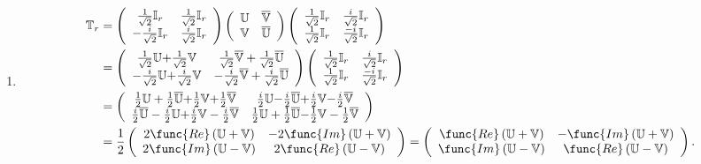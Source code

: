 \documentclass[aps,preprint]{revtex4}
\begin{document}
\begin{enumerate}
\item 
\begin{align}
\mathbb{T}_{r}& =\left( 
\begin{array}{cc}
\frac{1}{\sqrt{2}}\mathbb{I}_{r} & \frac{1}{\sqrt{2}}\mathbb{I}_{r} \\ 
-\frac{i}{\sqrt{2}}\mathbb{I}_{r} & \frac{i}{\sqrt{2}}\mathbb{I}_{r}%
\end{array}%
\right) \left( 
\begin{array}{cc}
\mathbb{U} & \overline{\mathbb{V}} \\ 
\mathbb{V} & \overline{\mathbb{U}}%
\end{array}%
\right) \left( 
\begin{array}{cc}
\frac{1}{\sqrt{2}}\mathbb{I}_{r} & \frac{i}{\sqrt{2}}\mathbb{I}_{r} \\ 
\frac{1}{\sqrt{2}}\mathbb{I}_{r} & \frac{-i}{\sqrt{2}}\mathbb{I}_{r}%
\end{array}%
\right) \\
& =\left( 
\begin{array}{cc}
\frac{1}{\sqrt{2}}\mathbb{U+}\frac{1}{\sqrt{2}}\mathbb{V} & \frac{1}{\sqrt{2}%
}\overline{\mathbb{V}}+\frac{1}{\sqrt{2}}\overline{\mathbb{U}} \\ 
-\frac{i}{\sqrt{2}}\mathbb{U+}\frac{i}{\sqrt{2}}\mathbb{V} & -\frac{i}{\sqrt{%
2}}\overline{\mathbb{V}}+\frac{i}{\sqrt{2}}\overline{\mathbb{U}}%
\end{array}%
\right) \left( 
\begin{array}{cc}
\frac{1}{\sqrt{2}}\mathbb{I}_{r} & \frac{i}{\sqrt{2}}\mathbb{I}_{r} \\ 
\frac{1}{\sqrt{2}}\mathbb{I}_{r} & \frac{-i}{\sqrt{2}}\mathbb{I}_{r}%
\end{array}%
\right) \\
& =\left( 
\begin{array}{cc}
\frac{1}{2}\mathbb{U}+\frac{1}{2}\mathbb{\overline{\mathbb{U}}+}\frac{1}{2}%
\mathbb{V+}\frac{1}{2}\overline{\mathbb{V}} & \frac{i}{2}\mathbb{U-}\frac{i}{%
2}\mathbb{\overline{\mathbb{U}}+}\frac{i}{2}\mathbb{V-}\frac{i}{2}\overline{%
\mathbb{V}} \\ 
\frac{i}{2}\overline{\mathbb{U}}-\frac{i}{2}\mathbb{U+}\frac{i}{2}\mathbb{V}-%
\frac{i}{2}\overline{\mathbb{V}} & \frac{1}{2}\mathbb{U}+\frac{1}{2}\mathbb{%
\overline{\mathbb{U}}-}\frac{1}{2}\mathbb{V}-\frac{1}{2}\overline{\mathbb{V}}%
\end{array}%
\right) \\
& =\frac{1}{2}\left( 
\begin{array}{cc}
2\func{Re}\left( \mathbb{U+V}\right) & -2\func{Im}\left( \mathbb{U+V}\right)
\\ 
2\func{Im}\left( \mathbb{U-V}\right) & 2\func{Re}\left( \mathbb{U-V}\right)%
\end{array}%
\right) =\left( 
\begin{array}{cc}
\func{Re}\left( \mathbb{U+V}\right) & -\func{Im}\left( \mathbb{U+V}\right)
\\ 
\func{Im}\left( \mathbb{U-V}\right) & \func{Re}\left( \mathbb{U-V}\right)%
\end{array}%
\right) .
\end{align}


\end{enumerate}
\end{document}
